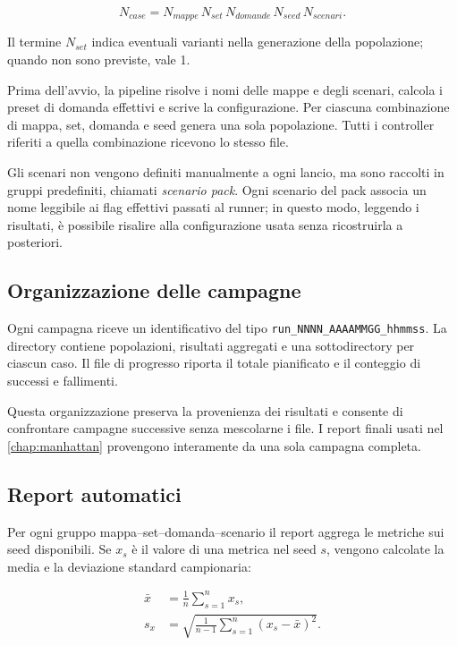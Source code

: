 \documentclass[12pt,a4paper,oneside]{report}
\numberwithin{equation}{chapter}
\begin{document}
\begin{equation}
    N_{case}=N_{mappe}\,N_{set}\,N_{domande}\,N_{seed}\,N_{scenari}.
    \label{eq:case-count}
\end{equation}

Il termine $N_{set}$ indica eventuali varianti nella generazione della
popolazione; quando non sono previste, vale 1.

Prima dell'avvio, la pipeline risolve i nomi delle mappe e degli scenari, calcola
i preset di domanda effettivi e scrive la configurazione. Per ciascuna
combinazione di mappa, set, domanda e seed genera una sola popolazione. Tutti i
controller riferiti a quella combinazione ricevono lo stesso file.

Gli scenari non vengono definiti manualmente a ogni lancio, ma sono raccolti in
gruppi predefiniti, chiamati \emph{scenario pack}. Ogni scenario del pack
associa un nome leggibile ai flag effettivi passati al runner; in questo modo,
leggendo i risultati, è possibile risalire alla configurazione usata senza
ricostruirla a posteriori.

\subsection{Organizzazione delle campagne}

Ogni campagna riceve un identificativo del tipo
\texttt{run\_NNNN\_AAAAMMGG\_hhmmss}. La directory contiene popolazioni,
risultati aggregati e una sottodirectory per ciascun caso. Il file di progresso
riporta il totale pianificato e il conteggio di successi e fallimenti.

Questa organizzazione preserva la provenienza dei risultati e consente di
confrontare campagne successive senza mescolarne i file. I report finali usati
nel \cref{chap:manhattan} provengono interamente da una sola campagna completa.

\subsection{Report automatici}

Per ogni gruppo mappa--set--domanda--scenario il report aggrega le metriche sui
seed disponibili. Se $x_s$ è il valore di una metrica nel seed $s$, vengono
calcolate la media e la deviazione standard campionaria:

\begin{align}
    \bar{x} &= \frac{1}{n}\sum_{s=1}^{n}x_s, \\
    s_x &= \sqrt{\frac{1}{n-1}\sum_{s=1}^{n}(x_s-\bar{x})^2}.
    \label{eq:mean-std}
\end{align}
\end{document}
